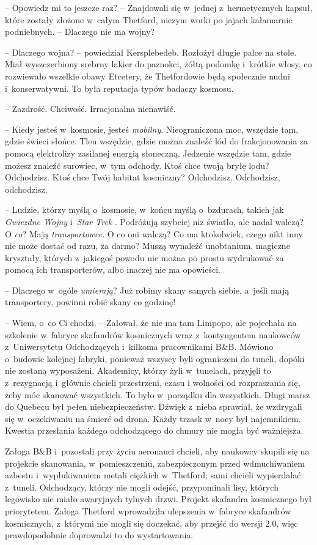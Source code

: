 \documentclass[oneside,polish,11pt,sfheadings]{mwbk}
\begin{document}
-- Opowiedz mi to jeszcze raz? -- Znajdowali się w~jednej z~hermetycznych
kapsuł, które zostały złożone w~całym Thetford, niczym worki po jajach
kałamarnic podniebnych. -- Dlaczego nie ma wojny?

-- Dlaczego wojna? -- powiedział Kersplebedeb. Rozłożył długie palce na
stole. Miał wyszczerbiony srebrny lakier do paznokci, żółtą podomkę i~krótkie włosy, co rozwiewało wszelkie obawy Etcetery, że Thetfordowie
będą społecznie nudni i~konserwatywni. To była reputacja typów badaczy
kosmosu.

-- Zazdrość. Chciwość. Irracjonalna nienawiść.

-- Kiedy jesteś w~kosmosie, jesteś \textit{mobilny}. Nieograniczona moc,
wszędzie tam, gdzie świeci słońce. Tlen wszędzie, gdzie można znaleźć
lód do frakcjonowania za pomocą elektrolizy zasilanej energią słoneczną.
Jedzenie wszędzie tam, gdzie możesz znaleźć surowiec, w~tym odchody.
Ktoś chce twoją bryłę lodu? Odchodzisz. Ktoś chce Twój habitat
kosmiczny? Odchodzisz. Odchodzisz, odchodzisz.

-- Ludzie, którzy myślą o~kosmosie, w~końcu myślą o~bzdurach, takich jak
\textit{Gwiezdne Wojny} i~\textit{Star Trek }. Podróżują szybciej niż
światło, ale nadal walczą? O \textit{co}? Mają \textit{transportowce}. O co
oni walczą? Co ma ktokolwiek, czego nikt inny nie może dostać od razu,
za darmo? Muszą wynaleźć unobtanium, magiczne kryształy, których z~jakiegoś powodu nie można po prostu wydrukować za pomocą ich
transporterów, albo inaczej nie ma opowieści.

-- Dlaczego w~ogóle \textit{umierają}? Już robimy skany samych siebie, a~jeśli mają transportery, powinni robić skany co godzinę!

-- Wiem, o~co Ci chodzi. -- Żałował, że nie ma tam Limpopo, ale pojechała
na szkolenie w~fabryce skafandrów kosmicznych wraz z~kontyngentem
naukowców z~Uniwersytetu Odchodzących i~kilkoma pracownikami B\&B.
Mówiono o~budowie kolejnej fabryki, ponieważ wszyscy byli ograniczeni do
tuneli, dopóki nie zostaną wyposażeni. Akademicy, którzy żyli w~tunelach, przyjęli to z~rezygnacją i~głównie chcieli przestrzeni, czasu
i wolności od rozpraszania się, żeby móc skanować wszystkich. To było w~porządku dla wszystkich. Długi marsz do Quebecu był pełen
niebezpieczeństw. Dźwięk z~nieba sprawiał, że wzdrygali się w~oczekiwaniu na śmierć od drona. Każdy trzask w~nocy był najemnikiem.
Kwestia przesłania każdego odchodzącego do chmury nie mogła być
ważniejsza.

Załoga B\&B i~pozostali przy życiu aeronauci chcieli, aby naukowcy
skupili się na projekcie skanowania, w~pomieszczeniu, zabezpieczonym
przed wdmuchiwaniem azbestu i~wypłukiwaniem metali ciężkich w~Thetford;
sami chcieli wypierdalać z~tuneli. Odchodzący, którzy nie mogli odejść,
przypominali lisy, których legowisko nie miało awaryjnych tylnych drzwi.
Projekt skafandra kosmicznego był priorytetem. Załoga Thetford
wprowadziła ulepszenia w~fabryce skafandrów kosmicznych, z~którymi nie
mogli się doczekać, aby przejść do wersji 2.0, więc prawdopodobnie
doprowadzi to do wystartowania.
\end{document}
